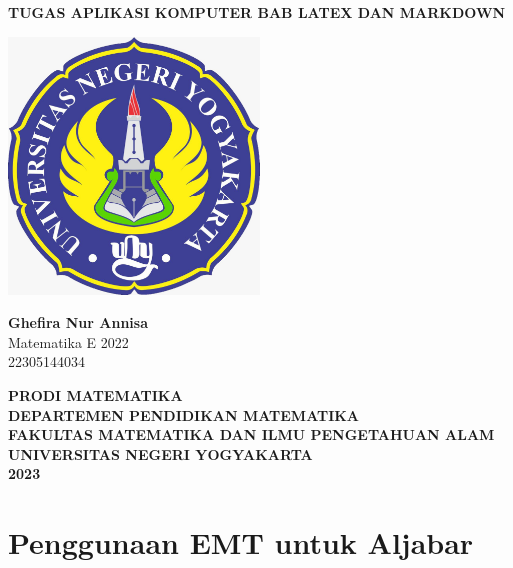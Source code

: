 \documentclass{report}
\begin{document}
\begin{titlepage}
    \begin{center}
        \vspace*{0,2cm}

        \Huge
        \textbf{TUGAS APLIKASI KOMPUTER BAB LATEX DAN MARKDOWN}

        \vspace{1cm}

        \LARGE

        \vspace{1cm}

        \includegraphics[width=0.5\textwidth]{Logo UNY.png}

        \vspace{3cm}


        \textbf{Ghefira Nur Annisa}\\Matematika E 2022\\22305144034

        \vspace{4cm}



        \Large
        \textbf{PRODI MATEMATIKA}\\
        \textbf{DEPARTEMEN PENDIDIKAN MATEMATIKA}\\
        \textbf{FAKULTAS MATEMATIKA DAN ILMU PENGETAHUAN ALAM}\\
        \textbf{UNIVERSITAS NEGERI YOGYAKARTA}\\
        \textbf{2023}

    \end{center}
\end{titlepage}

\newpage
\tableofcontents

\newpage
\chapter{Penggunaan EMT untuk Aljabar}

\end{document}
